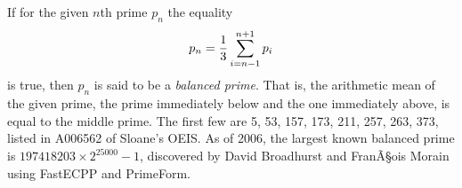\documentclass[12pt]{article}
\begin{document}
If for the given $n$th prime $p_n$ the equality $$p_n = {1 \over 3} \sum_{i = n - 1}^{n + 1} p_i$$ is true, then $p_n$ is said to be a {\em balanced prime}. That is, the arithmetic mean of the given prime, the prime immediately below and the one immediately above, is equal to the middle prime. The first few are 5, 53, 157, 173, 211, 257, 263, 373, listed in A006562 of Sloane's OEIS. As of 2006, the largest known balanced prime is $197418203 \times 2^{25000} - 1$, discovered by David Broadhurst and FranÃ§ois Morain using FastECPP and PrimeForm.
\end{document}
